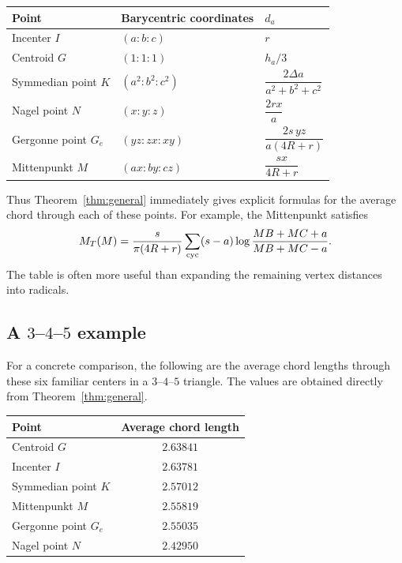 \documentclass[11pt]{article}
\theoremstyle{remark}
\newcommand{\area}{\Delta}
\begin{document}
\begin{center}
\begin{tabular}{lll}
\toprule
Point & Barycentric coordinates & $d_a$\\
\midrule
Incenter $I$ & $(a:b:c)$ & $r$\\[1mm]
Centroid $G$ & $(1:1:1)$ & $h_a/3$\\[1mm]
Symmedian point $K$ & $(a^2:b^2:c^2)$
 & $\dfrac{2\area a}{a^2+b^2+c^2}$\\[3mm]
Nagel point $N$ & $(x:y:z)$
 & $\dfrac{2rx}{a}$\\[3mm]
Gergonne point $G_e$ & $(yz:zx:xy)$
 & $\dfrac{2s\,yz}{a(4R+r)}$\\[3mm]
Mittenpunkt $M$ & $(ax:by:cz)$
 & $\dfrac{s x}{4R+r}$\\
\bottomrule
\end{tabular}
\end{center}

Thus Theorem~\ref{thm:general} immediately gives explicit formulas
for the average chord through each of these points.  For example, the
Mittenpunkt satisfies
\[
 {
 M_T(M)=
 \frac{s}{\pi(4R+r)}
 \sum_{\rm cyc}
 (s-a)
 \log\frac{MB+MC+a}{MB+MC-a}.
 }
\]
The table is often more useful than expanding the remaining vertex
distances into radicals.

\subsection{A $3$--$4$--$5$ example}

For a concrete comparison, the following are the average chord
lengths through these six familiar centers in a $3$--$4$--$5$
triangle.  The values are obtained directly from
Theorem~\ref{thm:general}.

\begin{center}
\begin{tabular}{lc}
\toprule
Point & Average chord length\\
\midrule
Centroid $G$ & $2.63841$\\
Incenter $I$ & $2.63781$\\
Symmedian point $K$ & $2.57012$\\
Mittenpunkt $M$ & $2.55819$\\
Gergonne point $G_e$ & $2.55035$\\
Nagel point $N$ & $2.42950$\\
\bottomrule
\end{tabular}
\end{center}
\end{document}
